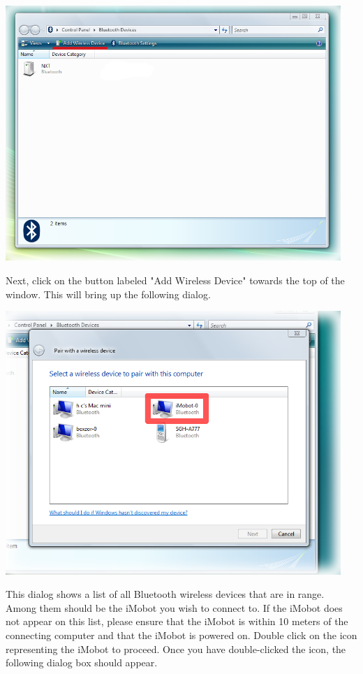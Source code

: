 \documentclass{article}
\begin{document}
\begin{center}
\includegraphics[width=5in]{images/imobot_connect_1a.png}
\end{center}

Next, click on the
button labeled "Add Wireless Device" towards the top of the window. This 
will bring up the following dialog.

\begin{center}
\includegraphics[width=5in]{images/imobot_connect_2.png}
\end{center}

This dialog shows a list of all Bluetooth wireless devices that are in range.
Among them should be the iMobot you wish to connect to. If the iMobot does not
appear on this list, please ensure that the iMobot is within 10 meters of the
connecting computer and that the iMobot is powered on. Double click on the icon
representing the iMobot to proceed. Once you have double-clicked the icon, the
following dialog box should appear.
\end{document}
